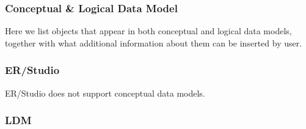 \subsubsection{Conceptual \& Logical Data Model}

Here we list objects that appear in both conceptual and logical data models, together with what additional information about them can be inserted by user.

\subsubsection{ER/Studio}

ER/Studio does not support conceptual data models.

\subsubsection{LDM}

